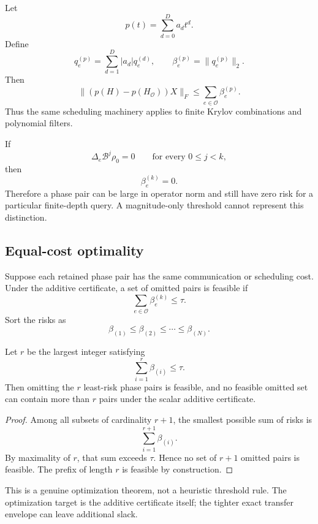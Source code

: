 \begin{corollary}
Let
\[
p(t)=\sum_{d=0}^{D}a_dt^d.
\]
Define
\[
q_e^{(p)}
=
\sum_{d=1}^{D}|a_d|q_e^{(d)},
\qquad
\beta_e^{(p)}=\lVert q_e^{(p)}\rVert_2.
\]
Then
\[
\boxed{
\lVert(p(H)-p(H_{\mathcal O}))X\rVert_F
\le
\sum_{e\in\mathcal O}\beta_e^{(p)}.
}
\]
Thus the same scheduling machinery applies to finite Krylov combinations and
polynomial filters.
\end{corollary}

\begin{corollary}
If
\[
\Delta_e\mathcal B^j\rho_0=0
\qquad
\text{for every }0\le j<k,
\]
then
\[
\beta_e^{(k)}=0.
\]
Therefore a phase pair can be large in operator norm and still have zero
risk for a particular finite-depth query.  A magnitude-only threshold cannot
represent this distinction.
\end{corollary}

\subsection{Equal-cost optimality}

Suppose each retained phase pair has the same communication or scheduling
cost.  Under the additive certificate, a set of omitted pairs is feasible if
\[
\sum_{e\in\mathcal O}\beta_e^{(k)}\le\tau.
\]
Sort the risks as
\[
\beta_{(1)}\le\beta_{(2)}\le\cdots\le\beta_{(N)}.
\]

\begin{theorem}
\label{thm:unit-cost-optimal}
Let $r$ be the largest integer satisfying
\[
\sum_{i=1}^{r}\beta_{(i)}\le\tau.
\]
Then omitting the $r$ least-risk phase pairs is feasible, and no feasible
omitted set can contain more than $r$ pairs under the scalar additive
certificate.
\end{theorem}

\begin{proof}
Among all subsets of cardinality $r+1$, the smallest possible sum of risks is
\[
\sum_{i=1}^{r+1}\beta_{(i)}.
\]
By maximality of $r$, that sum exceeds $\tau$.  Hence no set of $r+1$ omitted
pairs is feasible.  The prefix of length $r$ is feasible by construction.
\end{proof}

This is a genuine optimization theorem, not a heuristic threshold rule.  The
optimization target is the additive certificate itself; the tighter exact
transfer envelope can leave additional slack.

